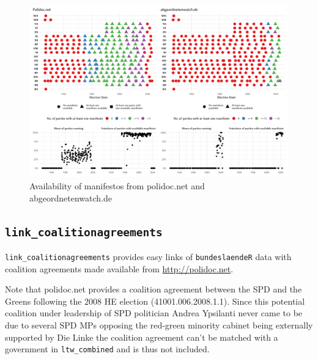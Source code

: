 \documentclass[
]{scrartcl}
\begin{document}
\begin{landscape}

\begin{figure}

{\centering \includegraphics{cbfiles/printmanifestoplot-1} 

}

\caption{\label{figure:manifestoavailability}Availability of manifestos from polidoc.net and abgeordnetenwatch.de}\label{fig:printmanifestoplot}
\end{figure}

\end{landscape}

\newpage

\hypertarget{link_coalitionagreements}{%
\subsection{\texorpdfstring{\texttt{link\_coalitionagreements}}{link\_coalitionagreements}}\label{link_coalitionagreements}}

\texttt{link\_coalitionagreements} provides easy links of
\texttt{bundeslaendeR} data with coalition agreements made available
from \url{http://polidoc.net}.

Note that polidoc.net provides a coalition agreement between the SPD and
the Greens following the 2008 HE election (41001.006.2008.1.1). Since
this potential coalition under leadership of SPD politician Andrea
Ypsilanti never came to be due to several SPD MPs opposing the red-green
minority cabinet being externally supported by Die Linke the coalition
agreement can't be matched with a government in \texttt{ltw\_combined}
and is thus not included.
\end{document}
